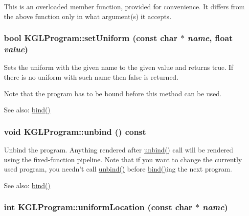 This is an overloaded member function, provided for convenience. It differs from the above function only in what argument(s) it accepts. \hypertarget{class_k_g_l_program_6704e664e129126050b6f5609da1ee61}{
\subsubsection[{setUniform}]{\setlength{\rightskip}{0pt plus 5cm}bool KGLProgram::setUniform (const char $\ast$ {\em name}, \/  float {\em value})}}
\label{class_k_g_l_program_6704e664e129126050b6f5609da1ee61}


Sets the uniform with the given name to the given value and returns true. If there is no uniform with such name then false is returned.

Note that the program has to be bound before this method can be used.

\begin{Desc}
\item[See also:]\hyperlink{class_k_g_l_program_48756f0c04a768d2fef06d7ac3d29207}{bind()} \end{Desc}
\hypertarget{class_k_g_l_program_a52890b41224848903a772049f374dc3}{
\subsubsection[{unbind}]{\setlength{\rightskip}{0pt plus 5cm}void KGLProgram::unbind () const}}
\label{class_k_g_l_program_a52890b41224848903a772049f374dc3}


Unbind the program. Anything rendered after \hyperlink{class_k_g_l_program_a52890b41224848903a772049f374dc3}{unbind()} call will be rendered using the fixed-function pipeline. Note that if you want to change the currently used program, you needn't call \hyperlink{class_k_g_l_program_a52890b41224848903a772049f374dc3}{unbind()} before \hyperlink{class_k_g_l_program_48756f0c04a768d2fef06d7ac3d29207}{bind()}ing the next program.

\begin{Desc}
\item[See also:]\hyperlink{class_k_g_l_program_48756f0c04a768d2fef06d7ac3d29207}{bind()} \end{Desc}
\hypertarget{class_k_g_l_program_9e38df2dc72639004319fef0c169e3c9}{
\subsubsection[{uniformLocation}]{\setlength{\rightskip}{0pt plus 5cm}int KGLProgram::uniformLocation (const char $\ast$ {\em name})}}
\label{class_k_g_l_program_9e38df2dc72639004319fef0c169e3c9}


